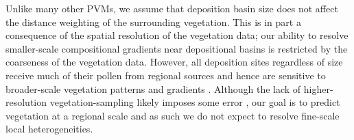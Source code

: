 \documentclass[12pt]{article}
\begin{document}
Unlike many other PVMs, we assume that deposition basin size does not
affect the distance weighting of the surrounding vegetation. This is
in part a consequence of the spatial resolution of the vegetation
data; our ability to resolve smaller-scale compositional gradients
near depositional basins is restricted by the coarseness of the
vegetation data. However, all deposition sites regardless of size
receive much of their pollen from regional sources and hence are
sensitive to broader-scale vegetation patterns and gradients
\citep{bradshaw1985relationships, prentice1987quantitative,
  jackson1991pollen, sugita2007theory1, sugita2007theory2}. Although
the lack of higher-resolution vegetation-sampling likely imposes some
error \citep{bradshaw1985relationships, prentice1987quantitative,
  jackson1990}, our goal is to predict vegetation at a regional scale
and as such we do not expect to resolve fine-scale local
heterogeneities.




\end{document}
